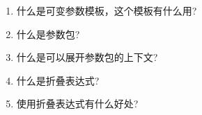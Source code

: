 \begin{enumerate}
\item
什么是可变参数模板，这个模板有什么用?

\item
什么是参数包?

\item
什么是可以展开参数包的上下文?

\item
什么是折叠表达式?

\item
使用折叠表达式有什么好处?
\end{enumerate}